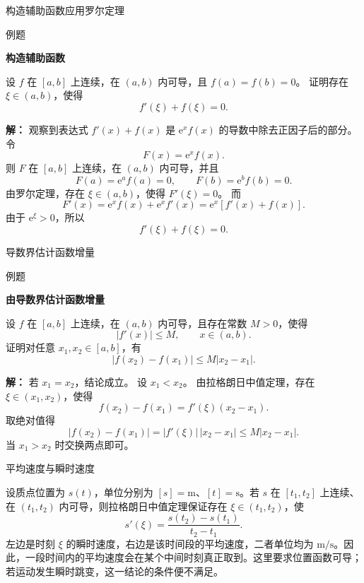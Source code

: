 \documentclass[aspectratio=169,10pt,fontset=fandol]{ctexbeamer}
\newcommand{\ee}{\mathrm{e}}
\begin{document}
\begin{frame}[t,fragile]{构造辅助函数应用罗尔定理}
\normalsize
\begin{block}{例题}
{\normalsize
\textbf{构造辅助函数}\par

设 $f$ 在 $[a,b]$ 上连续，在 $(a,b)$ 内可导，且 $f(a)=f(b)=0$。 证明存在 $\xi\in(a,b)$，使得
\[
f'(\xi)+f(\xi)=0.
\]

}
\end{block}
\pause
{\normalsize
\textbf{解：}
观察到表达式 $f'(x)+f(x)$ 是 $\ee^x f(x)$ 的导数中除去正因子后的部分。 令
\[
F(x)=\ee^x f(x).
\]
则 $F$ 在 $[a,b]$ 上连续，在 $(a,b)$ 内可导，并且
\[
F(a)=\ee^a f(a)=0,\qquad F(b)=\ee^b f(b)=0.
\]
由罗尔定理，存在 $\xi\in(a,b)$，使得 $F'(\xi)=0$。 而
\[
F'(x)=\ee^x f(x)+\ee^x f'(x)=\ee^x[f'(x)+f(x)].
\]
由于 $\ee^\xi>0$，所以
\[
f'(\xi)+f(\xi)=0.
\]

}
\end{frame}
\begin{frame}[t,fragile]{导数界估计函数增量}
\normalsize
\begin{block}{例题}
{\normalsize
\textbf{由导数界估计函数增量}\par

设 $f$ 在 $[a,b]$ 上连续，在 $(a,b)$ 内可导，且存在常数 $M>0$，使得
\[
|f'(x)|\leq M,\qquad x\in(a,b).
\]
证明对任意 $x_1,x_2\in[a,b]$，有
\[
|f(x_2)-f(x_1)|\leq M|x_2-x_1|.
\]

}
\end{block}
\pause
{\normalsize
\textbf{解：}
若 $x_1=x_2$，结论成立。 设 $x_1<x_2$。 由拉格朗日中值定理，存在 $\xi\in(x_1,x_2)$，使得
\[
f(x_2)-f(x_1)=f'(\xi)(x_2-x_1).
\]
取绝对值得
\[
|f(x_2)-f(x_1)|=|f'(\xi)|\,|x_2-x_1|\leq M|x_2-x_1|.
\]
当 $x_1>x_2$ 时交换两点即可。

}
\end{frame}
\begin{frame}[t,fragile]{平均速度与瞬时速度}
\normalsize
{\normalsize
\begin{application}[物理：平均速度与瞬时速度]
设质点位置为 $s(t)$，单位分别为 $[s]=\mathrm m$、$[t]=\mathrm s$。若 $s$ 在 $[t_1,t_2]$ 上连续、在 $(t_1,t_2)$ 内可导，则拉格朗日中值定理保证存在 $\xi\in(t_1,t_2)$，使
\[
s'(\xi)=\frac{s(t_2)-s(t_1)}{t_2-t_1}.
\]
左边是时刻 $\xi$ 的瞬时速度，右边是该时间段的平均速度，二者单位均为 $\mathrm{m/s}$。因此，一段时间内的平均速度会在某个中间时刻真正取到。这里要求位置函数可导；若运动发生瞬时跳变，这一结论的条件便不满足。
\end{application}
}
\end{frame}
\end{document}
